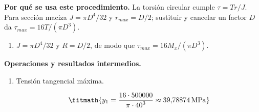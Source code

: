 \noindent\textbf{Por qué se usa este procedimiento.} La torsión circular cumple $\tau=Tr/J$. Para sección maciza $J=\pi D^4/32$ y $r_{max}=D/2$; sustituir y cancelar un factor $D$ da $\tau_{max}=16T/(\pi D^3)$.

\begin{enumerate}

\item $J = \pi D^4/32$ y $R = D/2$, de modo que $\tau_{max} = 16 M_x/(\pi D^3)$.

\end{enumerate}

\noindent\textbf{Operaciones y resultados intermedios.}

\begin{enumerate}

\item Tensión tangencial máxima.

\[\fitmath{y_{1}=\frac{16\cdot 500000}{\pi\cdot {40}^{3}}\approx 39{,}78874\,\mathrm{MPa}}\]

\end{enumerate}
